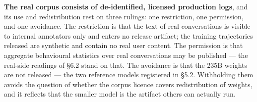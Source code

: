 \documentclass[letterpaper]{article}
\begin{document}
\textbf{The real corpus consists of de-identified, licensed production logs}, and its use and redistribution rest on three rulings: one restriction, one permission, and one avoidance. The restriction is that the text of real conversations is visible to internal annotators only and enters no release artifact; the training trajectories released are synthetic and contain no real user content. The permission is that aggregate behavioural statistics over real conversations may be published --- the real-side readings of \S{}6.2 stand on that. The avoidance is that the 235B weights are not released --- the two reference models registered in \S{}5.2. Withholding them avoids the question of whether the corpus licence covers redistribution of weights, and it reflects that the smaller model is the artifact others can actually run.
\end{document}
